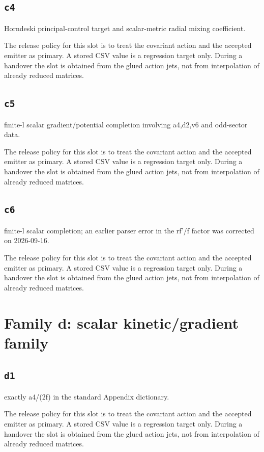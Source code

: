 \documentclass[11pt,a4paper,oneside]{book}
\begin{document}
\subsection{\texttt{c4}}
Horndeski principal-control target and scalar-metric radial mixing coefficient.

The release policy for this slot is to treat the covariant action and the accepted emitter as primary. A stored CSV value is a regression target only. During a handover the slot is obtained from the glued action jets, not from interpolation of already reduced matrices.\par

\subsection{\texttt{c5}}
finite-l scalar gradient/potential completion involving a4,d2,v6 and odd-sector data.

The release policy for this slot is to treat the covariant action and the accepted emitter as primary. A stored CSV value is a regression target only. During a handover the slot is obtained from the glued action jets, not from interpolation of already reduced matrices.\par

\subsection{\texttt{c6}}
finite-l scalar completion; an earlier parser error in the rf'/f factor was corrected on 2026-09-16.

The release policy for this slot is to treat the covariant action and the accepted emitter as primary. A stored CSV value is a regression target only. During a handover the slot is obtained from the glued action jets, not from interpolation of already reduced matrices.\par

\section{Family d: scalar kinetic/gradient family}
\subsection{\texttt{d1}}
exactly a4/(2f) in the standard Appendix dictionary.

The release policy for this slot is to treat the covariant action and the accepted emitter as primary. A stored CSV value is a regression target only. During a handover the slot is obtained from the glued action jets, not from interpolation of already reduced matrices.\par
\end{document}
